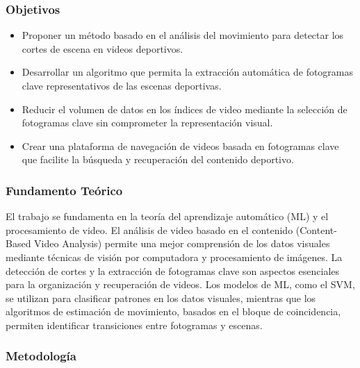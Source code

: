 \subsubsection{Objetivos}
\begin{itemize}
	\item Proponer un método basado en el análisis del movimiento para detectar los cortes de escena en videos deportivos.
	\item Desarrollar un algoritmo que permita la extracción automática de fotogramas clave representativos de las escenas deportivas.
	\item Reducir el volumen de datos en los índices de video mediante la selección de fotogramas clave sin comprometer la representación visual.
	\item Crear una plataforma de navegación de videos basada en fotogramas clave que facilite la búsqueda y recuperación del contenido deportivo.
\end{itemize}

\subsubsection{Fundamento Teórico}
El trabajo se fundamenta en la teoría del aprendizaje automático (ML) y el procesamiento de video. El análisis de video basado en el contenido (Content-Based Video Analysis) permite una mejor comprensión de los datos visuales mediante técnicas de visión por computadora y procesamiento de imágenes. La detección de cortes y la extracción de fotogramas clave son aspectos esenciales para la organización y recuperación de videos. Los modelos de ML, como el SVM, se utilizan para clasificar patrones en los datos visuales, mientras que los algoritmos de estimación de movimiento, basados en el bloque de coincidencia, permiten identificar transiciones entre fotogramas y escenas.
\subsubsection{Metodología}

